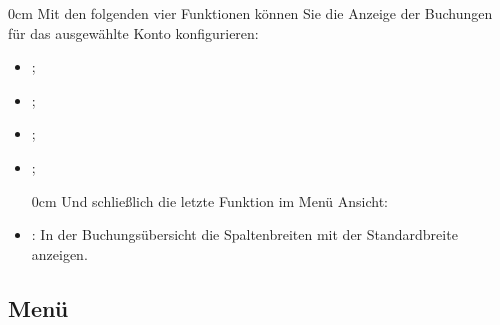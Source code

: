 \vspace{2mm}
\begin{addmargin*}[19pt]{0cm} 	%
Mit den folgenden vier Funktionen können Sie die Anzeige der Buchungen für das ausgewählte Konto konfigurieren:
\end{addmargin*}
\vspace{-2mm}
\begin{itemize}
	\item {};%
	\item {};%
	\item {};%
	\item {};%
	\vspace{2mm}
	\begin{addmargin*}[-10pt]{0cm} 	%
	Und schließlich die letzte Funktion im Menü Ansicht:
	\end{addmargin*}	
	\item {}: In der Buchungsübersicht die Spaltenbreiten mit der Standardbreite anzeigen.
\end{itemize}


\subsection{Menü \label{home-menus-help}}

